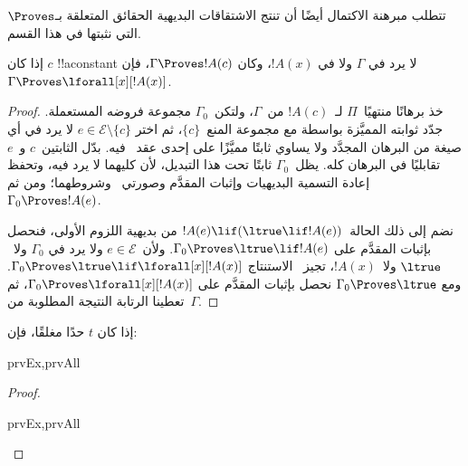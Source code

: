 \documentclass[../../../include/open-logic-section]{subfiles}
\begin{document}


\begin{explain}
  تتطلب مبرهنة الاكتمال أيضًا أن تنتج الاشتقاقات البديهية الحقائق
  المتعلقة بـ$\Proves$ التي نثبتها في هذا القسم.
\end{explain}

\begin{thm}
 إذا كان $c$ !!a{constant} لا يرد
في $\Gamma$ ولا في $!A(x)$، وكان $\Gamma \Proves !A(c)$، فإن $\Gamma
\Proves \lforall[x][!A(x)]$.
\end{thm}

\begin{proof}
خذ برهانًا منتهيًا~$\Pi$ لـ~$!A(c)$ من~$\Gamma$، ولتكن~$\Gamma_0$
مجموعة فروضه المستعملة. جدّد ثوابته المميَّزة بواسطة
 مع مجموعة المنع~$\{c\}$، ثم اختر
$e\in\mathcal E\setminus\{c\}$ لا يرد في أي صيغة من البرهان المجدَّد ولا يساوي ثابتًا
مميَّزًا على إحدى عقد~\QR{} فيه. بدّل الثابتين~$c$ و~$e$ تقابليًا في
البرهان كله. يظل~$\Gamma_0$ ثابتًا تحت هذا التبديل، لأن كليهما لا يرد
فيه، وتحفظ إعادة التسمية البديهيات وإثبات المقدَّم وصورتي~\QR{} وشروطهما؛
ومن ثم~$\Gamma_0 \Proves !A(e)$.

نضم إلى ذلك الحالة~$!A(e)\lif(\ltrue\lif !A(e))$ من بديهية اللزوم
الأولى، فنحصل بإثبات المقدَّم على
$\Gamma_0\Proves\ltrue\lif !A(e)$. ولأن~$e\in\mathcal E$ ولا يرد في
$\Gamma_0$ ولا~$\ltrue$ ولا~$!A(x)$، تجيز~\QR{} الاستنتاج
$\Gamma_0\Proves\ltrue\lif\lforall[x][!A(x)]$. ومع
$\Gamma_0\Proves\ltrue$ نحصل بإثبات المقدَّم على
$\Gamma_0\Proves\lforall[x][!A(x)]$، ثم تعطينا الرتابة النتيجة المطلوبة
من~$\Gamma$.
\end{proof}

\begin{prop}
إذا كان $t$ حدًا مغلقًا، فإن:
\begin{tagenumerate}{prvEx,prvAll}

\end{tagenumerate}
\end{prop}

\begin{proof}
\begin{tagenumerate}{prvEx,prvAll}
\end{tagenumerate}
\end{proof}
\end{document}
